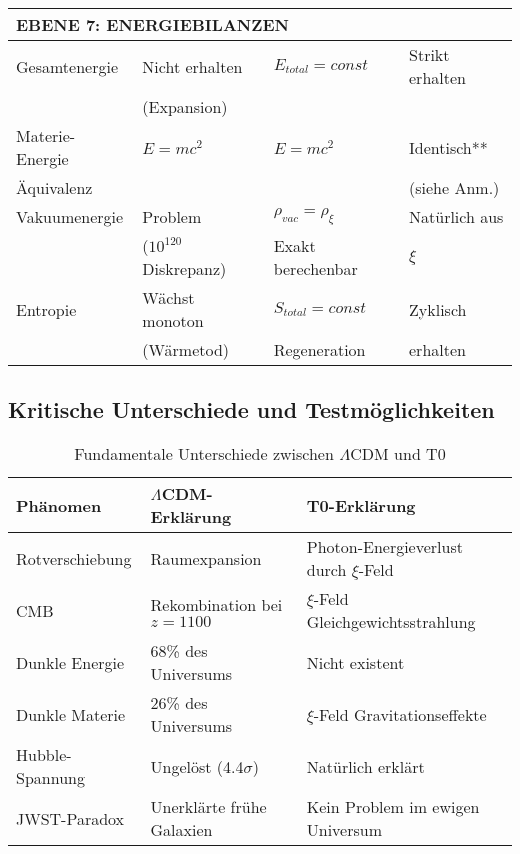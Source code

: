 \documentclass[12pt,a4paper]{article}
\theoremstyle{definition}
\begin{document}
\begin{longtable}{p{5cm}p{4cm}p{3.5cm}p{3.5cm}}
	\midrule
	\multicolumn{4}{l}{\textbf{EBENE 7: ENERGIEBILANZEN}} \\
	\midrule
	
	Gesamtenergie & Nicht erhalten & $E_{total} = const$ & Strikt erhalten \\
	& (Expansion) & & \\[0.3em]
	
	Materie-Energie & $E = mc^2$ & $E = mc^2$ & Identisch** \\
	Äquivalenz & & & (siehe Anm.) \\[0.3em]
	
	Vakuumenergie & Problem & $\rho_{vac} = \rho_\xi$ & Natürlich aus \\
	& ($10^{120}$ Diskrepanz) & Exakt berechenbar & $\xi$ \\[0.3em]
	
	Entropie & Wächst monoton & $S_{total} = const$ & Zyklisch \\
	& (Wärmetod) & Regeneration & erhalten \\[0.3em]
	
\end{longtable}

\subsection{Kritische Unterschiede und Testmöglichkeiten}
\label{subsec:critical_differences}

\begin{table}[h]
	\centering
	\begin{tabular}{p{4cm}p{5cm}p{5cm}}
		\toprule
		\textbf{Phänomen} & \textbf{$\Lambda$CDM-Erklärung} & \textbf{T0-Erklärung} \\
		\midrule
		Rotverschiebung & Raumexpansion & Photon-Energieverlust durch $\xi$-Feld \\
		CMB & Rekombination bei $z=1100$ & $\xi$-Feld Gleichgewichtsstrahlung \\
		Dunkle Energie & 68\% des Universums & Nicht existent \\
		Dunkle Materie & 26\% des Universums & $\xi$-Feld Gravitationseffekte \\
		Hubble-Spannung & Ungelöst (4.4$\sigma$) & Natürlich erklärt \\
		JWST-Paradox & Unerklärte frühe Galaxien & Kein Problem im ewigen Universum \\
		\bottomrule
	\end{tabular}
	\caption{Fundamentale Unterschiede zwischen $\Lambda$CDM und T0}
\end{table}
\end{document}
